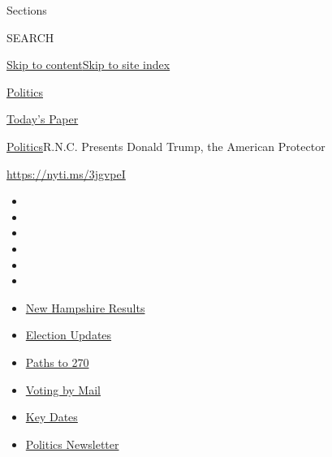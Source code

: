 Sections

SEARCH

\protect\hyperlink{site-content}{Skip to
content}\protect\hyperlink{site-index}{Skip to site index}

\href{https://www.nytimes3xbfgragh.onion/section/politics}{Politics}

\href{https://myaccount.nytimes3xbfgragh.onion/auth/login?response_type=cookie\&client_id=vi}{}

\href{https://www.nytimes3xbfgragh.onion/section/todayspaper}{Today's
Paper}

\href{/section/politics}{Politics}\textbar{}R.N.C. Presents Donald
Trump, the American Protector

\url{https://nyti.ms/3jgvpeI}

\begin{itemize}
\item
\item
\item
\item
\item
\item
\end{itemize}

\begin{itemize}
\item
  \href{https://www.nytimes3xbfgragh.onion/interactive/2020/09/08/us/elections/results-new-hampshire-primary-elections.html?action=click\&pgtype=Article\&state=default\&region=TOP_BANNER\&context=storylines_menu}{New
  Hampshire Results}
\item
  \href{https://www.nytimes3xbfgragh.onion/live/2020/09/08/us/trump-vs-biden?action=click\&pgtype=Article\&state=default\&region=TOP_BANNER\&context=storylines_menu}{Election
  Updates}
\item
  \href{https://www.nytimes3xbfgragh.onion/interactive/2020/us/elections/election-states-biden-trump.html?action=click\&pgtype=Article\&state=default\&region=TOP_BANNER\&context=storylines_menu}{Paths
  to 270}
\item
  \href{https://www.nytimes3xbfgragh.onion/interactive/2020/08/31/us/politics/vote-by-mail-deadlines.html?action=click\&pgtype=Article\&state=default\&region=TOP_BANNER\&context=storylines_menu}{Voting
  by Mail}
\item
  \href{https://www.nytimes3xbfgragh.onion/interactive/2019/us/elections/2020-presidential-election-calendar.html?action=click\&pgtype=Article\&state=default\&region=TOP_BANNER\&context=storylines_menu}{Key
  Dates}
\item
  \href{https://www.nytimes3xbfgragh.onion/newsletters/politics?action=click\&pgtype=Article\&state=default\&region=TOP_BANNER\&context=storylines_menu}{Politics
  Newsletter}
\end{itemize}

